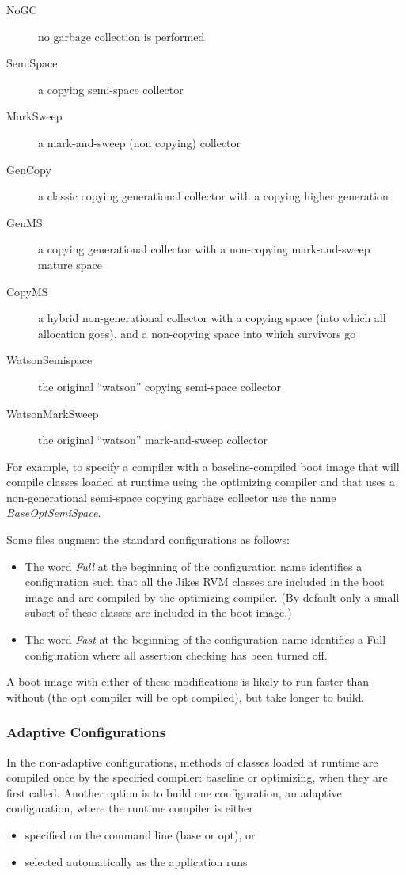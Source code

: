 \begin{description}
\item[NoGC] no garbage collection is performed
\item[SemiSpace] a copying semi-space collector
\item[MarkSweep] a mark-and-sweep (non copying) collector
\item[GenCopy] a classic copying generational collector with a copying
  higher generation
\item[GenMS] a copying generational collector with a non-copying
  mark-and-sweep mature space
\item[CopyMS] a hybrid non-generational collector with a copying space
  (into which all allocation goes), and a non-copying space into which
  survivors go
\item[WatsonSemispace] the original ``watson'' copying semi-space collector 
\item[WatsonMarkSweep] the original ``watson'' mark-and-sweep collector
\end{description}

For example, to specify a compiler with a baseline-compiled boot image
that will 
compile classes loaded at runtime using the optimizing compiler and that uses
a non-generational semi-space copying garbage collector use the name 
{\em BaseOptSemiSpace}.

Some files augment the standard configurations as follows:
\begin{itemize}
\item The word 
{\em Full} at the beginning of the configuration name identifies a 
configuration
such that all the Jikes RVM classes are included in the boot image 
and are compiled by the optimizing compiler. 
(By default only
a small subset of these classes are included in the boot image.)
\item The word
{\em Fast} at the beginning of the configuration name identifies a Full
configuration where all assertion checking has been turned off. 
\end{itemize}
A boot image with
either of these modifications is likely to run faster than without
(the opt compiler will be opt compiled), but take longer to build.  

\subsubsection{Adaptive Configurations} \label{adaptive-configs}
In the non-adaptive configurations, methods of classes
loaded at runtime are compiled once by the specified
compiler: baseline or optimizing, when they are first called.  Another
option is to build one configuration, 
an adaptive configuration,
where the runtime compiler is either
\begin{itemize}
\item specified on the command line (base or opt), or
\item selected automatically as the application runs
\end{itemize}

